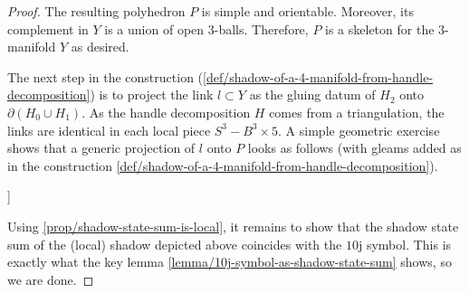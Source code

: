 \begin{proof}
  The resulting polyhedron $P$ is simple and orientable.
  Moreover, its complement in $Y$ is a union of open $3$-balls.
  Therefore, $P$ is a skeleton for the $3$-manifold $Y$ as
  desired.

  The next step in the construction
  (\ref{def/shadow-of-a-4-manifold-from-handle-decomposition}) is
  to project the link $l \subset Y$ as the gluing datum of
  $H_{2}$ onto $\partial(H_{0} \cup H_{1})$. As the handle
  decomposition $H$ comes from a triangulation, the links are
  identical in each local piece $S^{3} - B^{3} \times 5$. A
  simple geometric exercise shows that a generic projection of
  $l$ onto $P$ looks as follows (with gleams added as in the
  construction
  \ref{def/shadow-of-a-4-manifold-from-handle-decomposition}).

  \noindent [TODO: Add graphic [20220217T143000 (1)]]

  Using \ref{prop/shadow-state-sum-is-local}, it remains to show
  that the shadow state sum of the (local) shadow depicted above
  coincides with the $10$j symbol. This is exactly what the key
  lemma \ref{lemma/10j-symbol-as-shadow-state-sum} shows, so we
  are done.

\end{proof}
